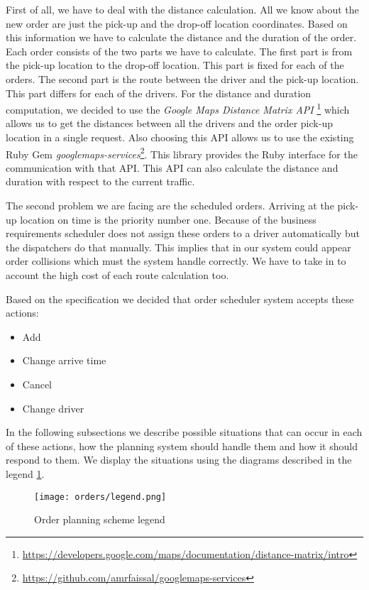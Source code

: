 First of all, we have to deal with the distance calculation. All we know about the new order are just the pick-up and the drop-off location coordinates. Based on this information we have to calculate the distance and the duration of the order. Each order consists of the two parts we have to calculate. The first part is from the pick-up location to the drop-off location. This part is fixed for each of the orders. The second part is the route between the driver and the pick-up location. This part differs for each of the drivers. For the distance and duration computation, we decided to use the \textit{Google Maps Distance Matrix API} \footnote{\url{https://developers.google.com/maps/documentation/distance-matrix/intro}} which allows us to get the distances between all the drivers and the order pick-up location in a single request. Also choosing this API allows us to use the existing Ruby Gem \textit{googlemaps-services}\footnote{\url{https://github.com/amrfaissal/googlemaps-services}}. This library provides the Ruby interface for the communication with that API. This API can also calculate the distance and duration with respect to the current traffic.

The second problem we are facing are the scheduled orders. Arriving at the pick-up location on time is the priority number one. Because of the business requirements scheduler does not assign these orders to a driver automatically but the dispatchers do that manually. This implies that in our system could appear order collisions which must the system handle correctly. We have to take in to account the high cost of each route calculation too.

Based on the specification we decided that order scheduler system accepts these actions:
\begin{itemize}
	\item Add
	\item Change arrive time
	\item Cancel
	\item Change driver
\end{itemize}


In the following subsections we describe possible situations that can occur in each of these actions, how the planning system should handle them and how it should respond to them. We display the situations using the diagrams described in the legend \ref{order-planning-legend}.

\begin{figure}[h]\centering
	\texttt{[image: orders/legend.png]}
	\caption{Order planning scheme legend}\label{order-planning-legend}
\end{figure} 



